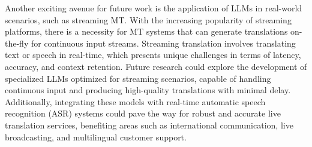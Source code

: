 \documentclass[11pt,english,listoffigures,listoftables]{tfgetsinf}
\begin{document}
Another exciting avenue for future work is the application of LLMs in real-world scenarios, such as streaming MT. With the increasing popularity of streaming platforms, there is a necessity for MT systems that can generate translations on-the-fly for continuous input streams. Streaming translation involves translating text or speech in real-time, which presents unique challenges in terms of latency, accuracy, and context retention. Future research could explore the development of specialized LLMs optimized for streaming scenarios, capable of handling continuous input and producing high-quality translations with minimal delay. Additionally, integrating these models with real-time automatic speech recognition (ASR) systems could pave the way for robust and accurate live translation services, benefiting areas such as international communication, live broadcasting, and multilingual customer support.






\end{document}
